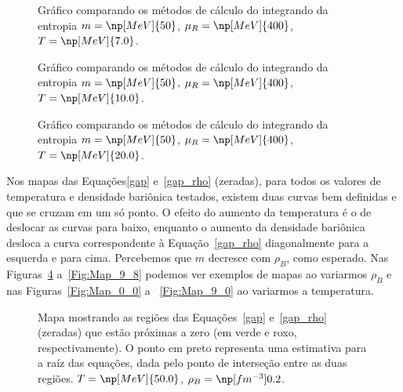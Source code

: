 \begin{figure}
	
	\caption{Gráfico comparando os métodos de cálculo do integrando da entropia $m = \np[MeV]{50}$, $\mu_R = \np[MeV]{400}$, $T = \np[MeV]{7.0}$. \protect}
	\label{Fig:Test_entropy_integrand_calc_0_4_2}
\end{figure}

\begin{figure}
	
	\caption{Gráfico comparando os métodos de cálculo do integrando da entropia $m = \np[MeV]{50}$, $\mu_R = \np[MeV]{400}$, $T = \np[MeV]{10.0}$. \protect}
	\label{Fig:Test_entropy_integrand_calc_0_4_3}
\end{figure}

\begin{figure}
	
	\caption{Gráfico comparando os métodos de cálculo do integrando da entropia $m = \np[MeV]{50}$, $\mu_R = \np[MeV]{400}$, $T = \np[MeV]{20.0}$. \protect}
	\label{Fig:Test_entropy_integrand_calc_0_4_4}
\end{figure}

\FloatBarrier



Nos mapas das Equações\eqref{gap} e~\eqref{gap_rho} (zeradas), para todos os valores de temperatura e densidade bariônica testados, existem duas curvas bem definidas e que se cruzam em um só ponto. O efeito do aumento da temperatura é o de deslocar as curvas para baixo, enquanto o aumento da densidade bariônica desloca a curva correspondente à Equação~\eqref{gap_rho} diagonalmente para a esquerda e para cima. Percebemos que $m$ decresce com $\rho_B$, como esperado. Nas Figuras~\ref{Fig:Map_9_4} a~\ref{Fig:Map_9_8} podemos ver exemplos de mapas ao variarmos $\rho_B$ e nas Figuras~\ref{Fig:Map_0_0} a ~\ref{Fig:Map_9_0} ao variarmos a temperatura.


\begin{figure}
	
	\caption{Mapa mostrando as regiões das Equações~\ref{gap} e~\ref{gap_rho} (zeradas) que estão próximas a zero (em verde e roxo, respectivamente). O ponto em preto representa uma estimativa para a raíz das equações, dada pelo ponto de interseção entre as duas regiões.  $T = \np[MeV]{50.0}$, $\rho_B = \np[fm^{-3}]{0.2}$.\protect}
	\label{Fig:Map_9_4}
\end{figure}

